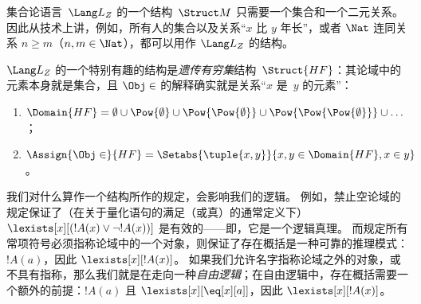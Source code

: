 \documentclass[../../../include/open-logic-section]{subfiles}
\begin{document}
\begin{ex}
集合论语言~$\Lang L_Z$ 的一个结构~$\Struct M$ 只需要一个集合和一个二元关系。
因此从技术上讲，例如，所有人的集合以及关系“$x$ 比 $y$ 年长”，或者 $\Nat$ 连同关系 $n \ge m$（$n, m \in \Nat$），都可以用作 $\Lang L_Z$ 的结构。

$\Lang L_Z$ 的一个特别有趣的结构是\emph{遗传有穷集}结构~$\Struct{{HF}}$：其论域中的元素本身就是集合，且 $\Obj \in$ 的解释确实就是关系“$x$ 是~$y$ 的元素”：
\begin{enumerate}
\item $\Domain{{{HF}}} = \emptyset \cup \Pow{\emptyset} \cup
  \Pow{\Pow{\emptyset}} \cup \Pow{\Pow{\Pow{\emptyset}}} \cup \dots$；
\item $\Assign{\Obj \in}{{{HF}}} = \Setabs{\tuple{x, y}}{x, y \in
  \Domain{{{HF}}}, x \in y}$。
\end{enumerate}
\end{ex}

\begin{digress}
我们对什么算作一个结构所作的规定，会影响我们的逻辑。
例如，禁止空论域的规定保证了（在关于量化语句的满足（或真）的通常定义下）$\lexists[x][(!A(x) \lor \lnot !A(x))]$ 是有效的——即，它是一个逻辑真理。
而规定所有常项符号必须指称论域中的一个对象，则保证了存在概括是一种可靠的推理模式：$!A(a)$，因此 $\lexists[x][!A(x)]$。
如果我们允许名字指称论域之外的对象，或不具有指称，那么我们就是在走向一种\emph{自由逻辑}；在自由逻辑中，存在概括需要一个额外的前提：$!A(a)$ 且 $\lexists[x][\eq[x][a]]$，因此 $\lexists[x][!A(x)]$。
\end{digress}
\end{document}
